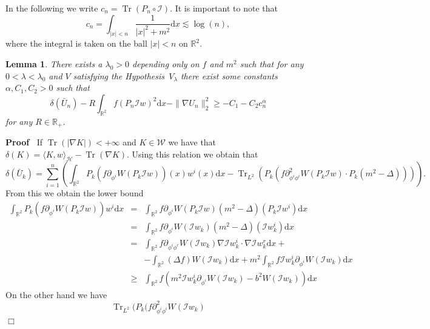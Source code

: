 \documentclass[a4paper,10pt]{article}
\newcommand{\mathd}{\mathrm{d}}
\newcommand{\tmop}[1]{\ensuremath{\operatorname{#1}}}
\newenvironment{proof}{\noindent\textbf{Proof\ }}{\hspace*{\fill}$\Box$\medskip}
\newtheorem{lemma}{Lemma}
\begin{document}
In the following we write $c_n = \tmop{Tr} (P_n \circ \mathcal{I})$. It is
important to note that
\[ c_n = \int_{| x | < n} \frac{1}{| x |^2 + m^2} \mathd x \lesssim \log (n),
\]
where the integral is taken on the ball $| x | < n$ on $\mathbb{R}^2$.

\begin{lemma}
  \label{lemma_inequality3}There exists a $\lambda_0 > 0$ depending only on
  $f$ and $m^2$ such that for any $0 < \lambda < \lambda_0$ and $V$ satisfying
  the Hypothesis~$V_{\lambda}$ there exist some constants $\alpha, C_1, C_2 >
  0$ such that
  \[ \delta (\bar{U}_n) - R \int_{\mathbb{R}^2} f (P_n \mathcal{I}w)^2 \mathd
     x -\| \nabla U_n \|^2_2 \geqslant - C_1 - C_2 c_n^{\alpha} \]
  for any $R \in \mathbb{R}_+$.
\end{lemma}

\begin{proof}
  If $\tmop{Tr} (| \nabla K |) < + \infty$ and $K \in \mathcal{W}$ we have
  that $\delta (K) = \langle K, w \rangle_{\mathcal{H}} - \tmop{Tr} (\nabla
  K)$. Using this relation we obtain that
  \[ \delta (\bar{U}_k) = \sum_{i = 1}^n \left( \int_{\mathbb{R}^2} P_k (f
     \partial_{\phi^i} W (P_k \mathcal{I}w)) (x) w^i (x) \mathd x -
     \tmop{Tr}_{L^2} (P_k (f \partial_{\phi^i \phi^i}^2 W (P_k \mathcal{I}w)
     \cdot P_k (m^2 - \Delta))) \right) . \]
  From this we obtain the lower bound
  \begin{eqnarray}
    \int_{\mathbb{R}^2} P_k (f \partial_{\phi^i} W (P_k \mathcal{I}w)) w^i
    \mathd x & = & \int_{\mathbb{R}^2} f \partial_{\phi^i} W (P_k
    \mathcal{I}w) (m^2 - \Delta) (P_k \mathcal{I}w^i) \mathd x \nonumber\\
    & = & \int_{\mathbb{R}^2} f \partial_{\phi^i} W (\mathcal{I}w_k) (m^2 -
    \Delta) (\mathcal{I}w_k^i) \mathd x \nonumber\\
    & = & \int_{\mathbb{R}^2} f \partial_{\phi^i \phi^r} W (\mathcal{I}w_k)
    \nabla \mathcal{I}w^i_k \cdot \nabla \mathcal{I}w^r_k \mathd x +
    \nonumber\\
    &  & - \int_{\mathbb{R}^2} (\Delta f) W (\mathcal{I}w_k) \mathd x + m^2
    \int_{\mathbb{R}^2} f\mathcal{I}w^i_k \partial_{\phi^i} W (\mathcal{I}w_k)
    \mathd x \nonumber\\
    & \geqslant & \int_{\mathbb{R}^2} f (m^2 \mathcal{I}w^i_k
    \partial_{\phi^i} W (\mathcal{I}w_k) - b^2 W (\mathcal{I}w_k)) \mathd x
    \nonumber
  \end{eqnarray}
  On the other hand we have
  \[ \tmop{Tr}_{L^2} (P_k (f \partial_{\phi^i \phi^i}^2 W (\mathcal{I}w_k)
\]
\end{proof}
\end{document}
